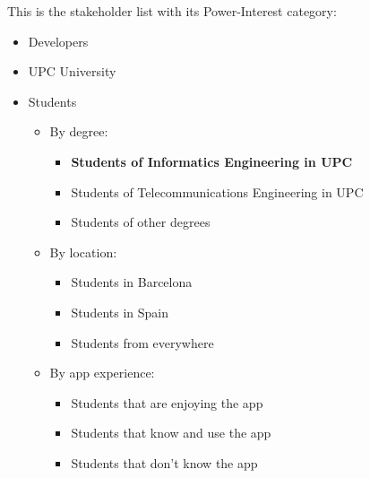 \noindent
This is the stakeholder list with its Power-Interest category:
\begin{itemize}
    \item \tikzcircle[fill=Green]{6pt} Developers
    \item \tikzcircle[fill=Magenta]{6pt} UPC University
    \item \tikzcircle[fill=Green]{6pt} Students
    \begin{itemize}
        \item By degree:
        \begin{itemize}
            \item \tikzcircle[fill=Green]{6pt} \textbf{Students of Informatics Engineering in UPC}
            \item \tikzcircle[fill=Green]{6pt} Students of Telecommunications Engineering in UPC
            \item \tikzcircle[fill=Cyan]{6pt} Students of other degrees
        \end{itemize}
        \item By location:
        \begin{itemize}
            \item \tikzcircle[fill=Green]{6pt} Students in Barcelona
            \item \tikzcircle[fill=Goldenrod]{6pt} Students in Spain
            \item \tikzcircle[fill=Magenta]{6pt} Students from everywhere
        \end{itemize}
        \item By app experience:
        \begin{itemize}
            \item \tikzcircle[fill=Green]{6pt} Students that are enjoying the app
            \item \tikzcircle[fill=Green]{6pt} Students that know and use the app
            \item \tikzcircle[fill=Magenta]{6pt} Students that don't know the app
        \end{itemize}
    \end{itemize}
\end{itemize}
